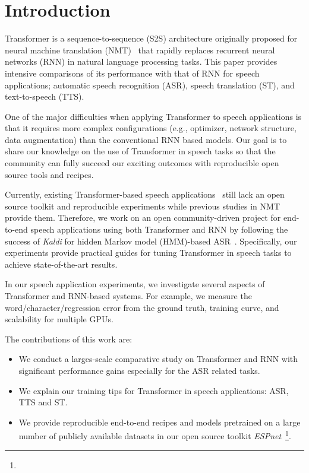 \section{Introduction}
\label{sec:introduction}

Transformer is a sequence-to-sequence (S2S) architecture originally proposed for neural machine translation (NMT)~\cite{VaswaniNIPS2017_7181} that rapidly replaces recurrent neural networks (RNN) in natural language processing tasks. This paper provides intensive comparisons of its performance with that of RNN for speech applications; automatic speech recognition (ASR), speech translation (ST), and text-to-speech (TTS).

One of the major difficulties when applying Transformer to speech applications is that it requires more complex configurations (e.g., optimizer, network structure, data augmentation) than the conventional RNN based models.
Our goal is to share our knowledge on the use of Transformer in speech tasks so that the community can fully succeed our exciting outcomes with reproducible open source tools and recipes.

Currently, existing Transformer-based speech applications~\cite{speech-transformer,CrossVila2018,li2019close} still lack an open source toolkit and reproducible experiments while previous studies in NMT~\cite{ott-etal-2018-scaling,tensor2tensor-W18-1819} provide them.
Therefore, we work on an open community-driven project for end-to-end speech applications using both Transformer and RNN by following the success of \textit{Kaldi} for hidden Markov model (HMM)-based ASR~\cite{kaldi}.
Specifically, our experiments provide practical guides for tuning Transformer in speech tasks to achieve state-of-the-art results.

In our speech application experiments, we investigate several aspects of Transformer and RNN-based systems. 
For example, we measure the word/character/regression error from the ground truth, training curve, and scalability for multiple GPUs.

The contributions of this work are:
{
\setlength{\leftmargini}{15pt}  
\begin{itemize}
	\setlength{\itemsep}{1pt}      \setlength{\parskip}{0pt}      \setlength{\itemindent}{0pt}   \setlength{\labelsep}{4pt}     \item We conduct a larges-scale comparative study on Transformer and RNN with significant performance gains especially for the ASR related tasks.
    \item We explain our training tips for Transformer in speech applications: ASR, TTS and ST. 
\item  We provide reproducible end-to-end recipes and models pretrained on a large number of publicly available datasets in our open source toolkit \textit{ESPnet}~\cite{espnet}\footnote{\espneturl}.
\end{itemize}
}

